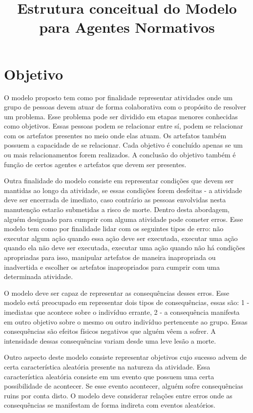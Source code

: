 \documentclass[12pt]{article}
\title{Estrutura conceitual do Modelo para Agentes Normativos}
\begin{document}
 

\section{Objetivo}

O modelo proposto tem como por finalidade representar atividades onde um grupo de pessoas  devem atuar de forma colaborativa com o propósito de resolver um problema. Esse problema pode ser dividido em etapas menores conhecidas como objetivos. Essas pessoas podem se relacionar entre sí, podem se relacionar com os artefatos presentes no meio 
onde elas atuam. Os artefatos também possuem a capacidade de se relacionar. Cada objetivo é concluído apenas se  um ou mais relacionamentos forem realizados. A conclusão do objetivo também é função de certos agentes e artefatos que devem ser presentes. 

Outra finalidade do modelo consiste em representar condições que devem ser mantidas ao longo da atividade, se essas condições forem desfeitas - a atividade deve ser encerrada de imediato, caso contrário as pessoas envolvidas nesta manutenção estarão submetidas a risco de morte. Dentro desta abordagem, alguém designado para cumprir com alguma atividade pode cometer erros. Esse modelo tem como por finalidade lidar com os seguintes tipos de erro: não executar algum ação quando essa ação deve ser executada, executar uma ação quando ela não deve ser executada, executar uma ação quando não há condições apropriadas para isso, manipular artefatos de maneira inapropriada ou inadvertida e escolher os artefatos inapropriados para cumprir com uma determinada atividade.

O modelo deve ser capaz de representar as consequências desses erros. Esse modelo está preocupado em representar dois tipos de consequências, essas são: 1 - imediatas que acontece sobre o indivíduo errante, 2 - a consequência manifesta em outro objetivo sobre o mesmo ou outro indivíduo pertencente ao grupo. Essas consequências são efeitos físicos negativos que alguém vêem a sofrer. A intensidade dessas consequências variam desde uma leve lesão a morte.

Outro aspecto deste modelo consiste representar objetivos cujo sucesso advem de certa característica aleatória presente na natureza da atividade. Essa característica aleatória consiste em um evento que possuem uma certa possibilidade de acontecer. Se esse evento acontecer, alguém sofre consequências ruins por conta disto. O modelo deve considerar relações entre erros onde as consequências se manifestam de forma indireta com eventos aleatórios.         
\end{document}
